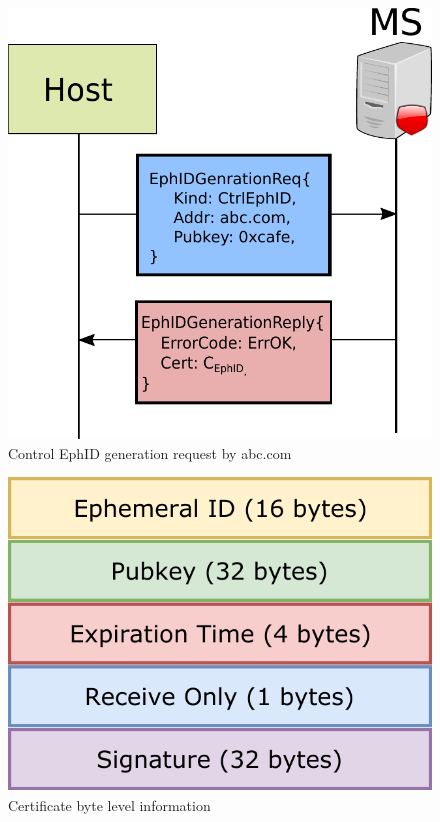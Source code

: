 \begin{figure}[th!!]
\centering
\includegraphics[scale=0.6]{Figures/ephid_gen.pdf}
\decoRule
\caption[EphID Generation Request]{Control EphID generation request by abc.com}
\label{fig:ephid_gen}
\end{figure}

\begin{figure}[th!!]
\centering
\includegraphics[scale=0.6]{Figures/certificate.pdf}
\decoRule
\caption[EphID Certificate byte level information]{Certificate byte level information}
\label{fig:ephid_cert}
\end{figure}

